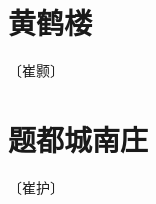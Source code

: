 \documentclass[12pt,UTF-8,openany]{ctexbook}
\begin{document}
\vspace{8pt}


\section{黄鹤楼}

\begin{center}
    \vspace{10pt}
    
    \begin{normalsize}
        
        〔崔颢〕
        
    \end{normalsize}
    
    \vspace{8pt}
    
    \begin{large}
        
        
        
        
        
    \end{large}
    
\end{center}

\vspace{8pt}


\section{题都城南庄}

\begin{center}
    \vspace{10pt}
    
    \begin{normalsize}
        
        〔崔护〕
        
    \end{normalsize}
    
    \vspace{8pt}
    
    \begin{large}
        
        
        
    \end{large}
    
\end{center}
\end{document}
